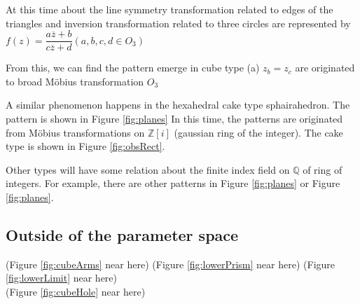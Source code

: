 \documentclass[suppldata, dvipdfmx]{interact}
\theoremstyle{plain}%
\theoremstyle{definition}
\theoremstyle{remark}
\theoremstyle{problemstyle}
\begin{document}
At this time about the line symmetry transformation related to edges of
the triangles and inversion transformation related to three circles 
are represented by
$f(z) = \dfrac{a\overline{z} + b}{c\overline{z}+ d} (a, b, c, d \in O_3)$

From this, we can find the pattern emerge in cube type (a) $z_b = z_c$
are originated to broad M\"obius transformation $O_3$

A similar phenomenon happens in the hexahedral cake type sphairahedron.
The pattern is shown in Figure \ref{fig:planes}
In this time, the patterns are originated from M\"obius transformations
on $\mathbb{Z}[i]$ (gaussian ring of the integer).
The cake type is shown in Figure \ref{fig:obsRect}.

Other types will have some relation about the finite index field on
 $\mathbb{Q}$ of ring of integers.
For example, there are other patterns in Figure
 \ref{fig:planes} or
 Figure \ref{fig:planes}.

\subsection{Outside of the parameter space}

\noindent(Figure \ref{fig:cubeArms} near here)
(Figure \ref{fig:lowerPrism} near here)
(Figure \ref{fig:lowerLimit} near here)\\
(Figure \ref{fig:cubeHole}
 near here)
\end{document}
